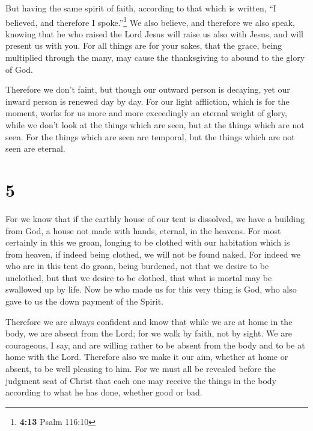  But having the same spirit of faith, according to that
which is written, ``I believed, and therefore I spoke.''\footnote{\textbf{4:13}
  Psalm 116:10} We also believe, and therefore we also speak,
 knowing that he who raised the Lord Jesus will raise us
also with Jesus, and will present us with you.  For all
things are for your sakes, that the grace, being multiplied through the
many, may cause the thanksgiving to abound to the glory of God.

 Therefore we don't faint, but though our outward person
is decaying, yet our inward person is renewed day by day.
 For our light affliction, which is for the moment, works
for us more and more exceedingly an eternal weight of glory,
 while we don't look at the things which are seen, but at
the things which are not seen. For the things which are seen are
temporal, but the things which are not seen are eternal.

\hypertarget{section-4}{%
\section{5}\label{section-4}}

 For we know that if the earthly house of our tent is
dissolved, we have a building from God, a house not made with hands,
eternal, in the heavens.  For most certainly in this we
groan, longing to be clothed with our habitation which is from heaven,
 if indeed being clothed, we will not be found naked.
 For indeed we who are in this tent do groan, being
burdened, not that we desire to be unclothed, but that we desire to be
clothed, that what is mortal may be swallowed up by life. 
Now he who made us for this very thing is God, who also gave to us the
down payment of the Spirit.

 Therefore we are always confident and know that while we
are at home in the body, we are absent from the Lord;  for
we walk by faith, not by sight.  We are courageous, I say,
and are willing rather to be absent from the body and to be at home with
the Lord.  Therefore also we make it our aim, whether at
home or absent, to be well pleasing to him.  For we must
all be revealed before the judgment seat of Christ that each one may
receive the things in the body according to what he has done, whether
good or bad.

